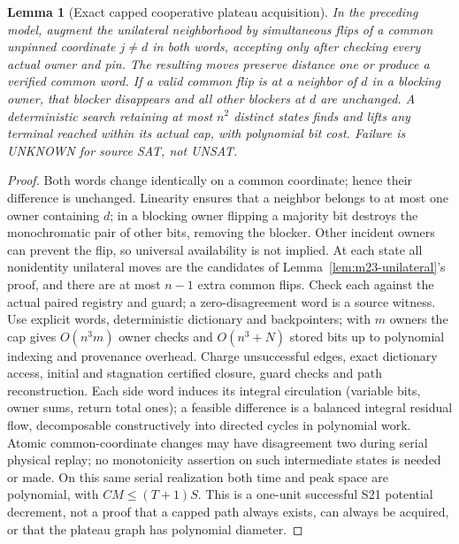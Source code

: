 \documentclass[11pt]{article}
\newtheorem{lemma}[theorem]{Lemma}
\begin{document}
\begin{lemma}[Exact capped cooperative plateau acquisition]\label{lem:m23-joint}
In the preceding model, augment the unilateral neighborhood by simultaneous flips of a common unpinned coordinate $j\ne d$ in both words, accepting only after checking every actual owner and pin. The resulting moves preserve distance one or produce a verified common word. If a valid common flip is at a neighbor of $d$ in a blocking owner, that blocker disappears and all other blockers at $d$ are unchanged. A deterministic search retaining at most $n^2$ distinct states finds and lifts any terminal reached within its actual cap, with polynomial bit cost. Failure is UNKNOWN for source SAT, not UNSAT.
\end{lemma}
\begin{proof}
Both words change identically on a common coordinate; hence their difference is unchanged. Linearity ensures that a neighbor belongs to at most one owner containing $d$; in a blocking owner flipping a majority bit destroys the monochromatic pair of other bits, removing the blocker. Other incident owners can prevent the flip, so universal availability is not implied. At each state all nonidentity unilateral moves are the candidates of Lemma~\ref{lem:m23-unilateral}'s proof, and there are at most $n-1$ extra common flips. Check each against the actual paired registry and guard; a zero-disagreement word is a source witness. Use explicit words, deterministic dictionary and backpointers; with $m$ owners the cap gives $O(n^3m)$ owner checks and $O(n^3+N)$ stored bits up to polynomial indexing and provenance overhead. Charge unsuccessful edges, exact dictionary access, initial and stagnation certified closure, guard checks and path reconstruction. Each side word induces its integral circulation (variable bits, owner sums, return total ones); a feasible difference is a balanced integral residual flow, decomposable constructively into directed cycles in polynomial work. Atomic common-coordinate changes may have disagreement two during serial physical replay; no monotonicity assertion on such intermediate states is needed or made. On this same serial realization both time and peak space are polynomial, with $CM\le(T+1)S$. This is a one-unit successful S21 potential decrement, not a proof that a capped path always exists, can always be acquired, or that the plateau graph has polynomial diameter.
\end{proof}
\end{document}
